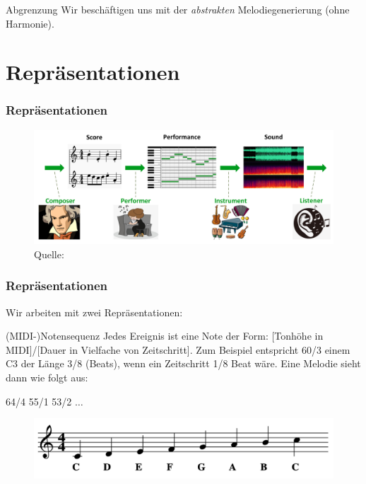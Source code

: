 \documentclass[aspectratio=169]{beamer}
\begin{document}
\begin{frame}
	\begin{block}{Abgrenzung}
		Wir beschäftigen uns mit der \textit{abstrakten} Melodiegenerierung (ohne Harmonie).
	\end{block}
\end{frame}

\section{Repräsentationen}

\begin{frame}
	\frametitle{Repräsentationen}
	\begin{figure}
		\includegraphics[width=\textwidth]{overview}
		\caption{Quelle: \cite{shulei:2020}}
	\end{figure}
\end{frame}

\begin{frame}
	\frametitle{Repräsentationen}
	Wir arbeiten mit zwei Repräsentationen:
	
	\begin{block}{(MIDI-)Notensequenz}
		Jedes Ereignis ist eine Note der Form: [Tonhöhe in MIDI]/[Dauer in Vielfache von Zeitschritt].
		Zum Beispiel entspricht 60/3 einem C3 der Länge 3/8 (Beats), wenn ein Zeitschritt 1/8 Beat wäre.
		Eine Melodie sieht dann wie folgt aus:
		\begin{center}
			64/4 55/1 53/2 $\ldots$
		\end{center}
	\end{block}
	
	\begin{figure}
		\includegraphics[width=\textwidth]{note-notation}
	\end{figure}
\end{frame}
\end{document}
